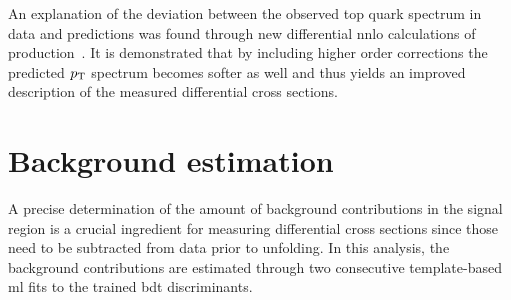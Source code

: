 
An explanation of the deviation between the observed top quark \pt spectrum in data and predictions was found through new differential \gls{nnlo} calculations of \ttbar production~\cite{Czakon:2015owf}. It is demonstrated that by including higher order corrections the predicted $p_\textrm{T}$ spectrum becomes softer as well and thus yields an improved description of the measured differential \ttbar cross sections.



\section{Background estimation}
\label{sec:polarization-fit}

A precise determination of the amount of background contributions in the signal region is a crucial ingredient for measuring differential cross sections since those need to be subtracted from data prior to unfolding. In this analysis, the background contributions are estimated through two consecutive template-based \gls{ml} fits to the trained \gls{bdt} discriminants.

